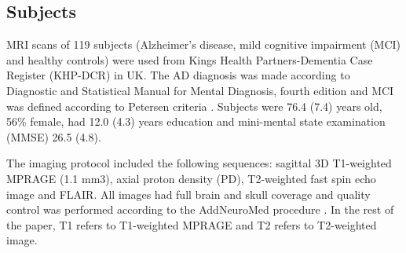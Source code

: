 \subsection{Subjects} \label{subjects}
MRI scans of 119 subjects (Alzheimer’s disease, mild cognitive impairment (MCI) and healthy controls) were used from Kings Health Partners-Dementia Case Register (KHP-DCR) in UK. The AD diagnosis was made according to Diagnostic and Statistical Manual for Mental Diagnosis, fourth edition and MCI was defined according to Petersen criteria \cite{PetersonMCI}. Subjects were 76.4 (7.4) years old, 56\% female, had 12.0 (4.3) years education and mini-mental state examination (MMSE) 26.5 (4.8).
\par
The imaging protocol included the following sequences: sagittal 3D T1-weighted MPRAGE (1.1 mm3), axial proton density (PD), T2-weighted fast spin echo image and FLAIR. All images had full brain and skull coverage and quality control was performed according to the AddNeuroMed procedure \cite{AddNeuroMed}. In the rest of the paper, T1 refers to T1-weighted MPRAGE and T2 refers to T2-weighted image.

  
  